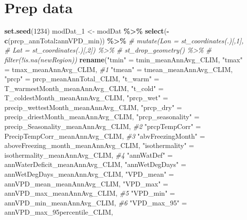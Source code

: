 \documentclass[
]{article}
\newenvironment{Shaded}{\begin{snugshade}}{\end{snugshade}}
\newcommand{\CommentTok}[1]{\textcolor[rgb]{0.56,0.35,0.01}{\textit{#1}}}
\newcommand{\DecValTok}[1]{\textcolor[rgb]{0.00,0.00,0.81}{#1}}
\newcommand{\FunctionTok}[1]{\textcolor[rgb]{0.13,0.29,0.53}{\textbf{#1}}}
\newcommand{\NormalTok}[1]{#1}
\newcommand{\OtherTok}[1]{\textcolor[rgb]{0.56,0.35,0.01}{#1}}
\newcommand{\SpecialCharTok}[1]{\textcolor[rgb]{0.81,0.36,0.00}{\textbf{#1}}}
\newcommand{\StringTok}[1]{\textcolor[rgb]{0.31,0.60,0.02}{#1}}
\begin{document}
\section{Prep data}\label{prep-data}

\begin{Shaded}
\begin{Highlighting}[]
\FunctionTok{set.seed}\NormalTok{(}\DecValTok{1234}\NormalTok{)}
\NormalTok{modDat\_1 }\OtherTok{\textless{}{-}}\NormalTok{ modDat }\SpecialCharTok{\%\textgreater{}\%} 
  \FunctionTok{select}\NormalTok{(}\SpecialCharTok{{-}}\FunctionTok{c}\NormalTok{(prcp\_annTotal}\SpecialCharTok{:}\NormalTok{annVPD\_min)) }\SpecialCharTok{\%\textgreater{}\%} 
  \CommentTok{\# mutate(Lon = st\_coordinates(.)[,1], }
  \CommentTok{\#        Lat = st\_coordinates(.)[,2])  \%\textgreater{}\% }
  \CommentTok{\# st\_drop\_geometry() \%\textgreater{}\% }
  \CommentTok{\# filter(!is.na(newRegion))}
  \FunctionTok{rename}\NormalTok{(}\StringTok{"tmin"} \OtherTok{=}\NormalTok{ tmin\_meanAnnAvg\_CLIM, }
     \StringTok{"tmax"} \OtherTok{=}\NormalTok{ tmax\_meanAnnAvg\_CLIM, }\CommentTok{\#1}
     \StringTok{"tmean"} \OtherTok{=}\NormalTok{ tmean\_meanAnnAvg\_CLIM, }
     \StringTok{"prcp"} \OtherTok{=}\NormalTok{ prcp\_meanAnnTotal\_CLIM, }
     \StringTok{"t\_warm"} \OtherTok{=}\NormalTok{ T\_warmestMonth\_meanAnnAvg\_CLIM,}
     \StringTok{"t\_cold"} \OtherTok{=}\NormalTok{ T\_coldestMonth\_meanAnnAvg\_CLIM, }
     \StringTok{"prcp\_wet"} \OtherTok{=}\NormalTok{ precip\_wettestMonth\_meanAnnAvg\_CLIM,}
     \StringTok{"prcp\_dry"} \OtherTok{=}\NormalTok{ precip\_driestMonth\_meanAnnAvg\_CLIM, }
     \StringTok{"prcp\_seasonality"} \OtherTok{=}\NormalTok{ precip\_Seasonality\_meanAnnAvg\_CLIM, }\CommentTok{\#2}
     \StringTok{"prcpTempCorr"} \OtherTok{=}\NormalTok{ PrecipTempCorr\_meanAnnAvg\_CLIM,  }\CommentTok{\#3}
     \StringTok{"abvFreezingMonth"} \OtherTok{=}\NormalTok{ aboveFreezing\_month\_meanAnnAvg\_CLIM, }
     \StringTok{"isothermality"} \OtherTok{=}\NormalTok{ isothermality\_meanAnnAvg\_CLIM, }\CommentTok{\#4}
     \StringTok{"annWatDef"} \OtherTok{=}\NormalTok{ annWaterDeficit\_meanAnnAvg\_CLIM, }
     \StringTok{"annWetDegDays"} \OtherTok{=}\NormalTok{ annWetDegDays\_meanAnnAvg\_CLIM,}
     \StringTok{"VPD\_mean"} \OtherTok{=}\NormalTok{ annVPD\_mean\_meanAnnAvg\_CLIM, }
     \StringTok{"VPD\_max"} \OtherTok{=}\NormalTok{ annVPD\_max\_meanAnnAvg\_CLIM, }\CommentTok{\#5}
     \StringTok{"VPD\_min"} \OtherTok{=}\NormalTok{ annVPD\_min\_meanAnnAvg\_CLIM, }\CommentTok{\#6}
     \StringTok{"VPD\_max\_95"} \OtherTok{=}\NormalTok{ annVPD\_max\_95percentile\_CLIM, }

\end{Highlighting}
\end{Shaded}
\end{document}
